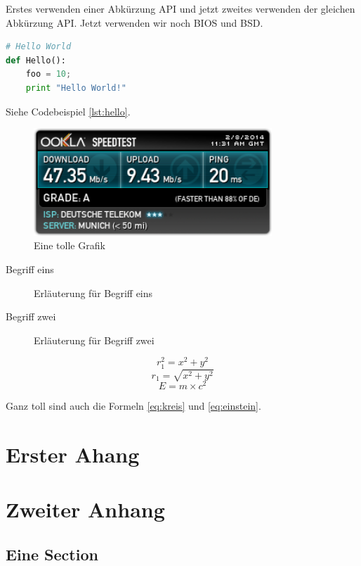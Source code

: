 \documentclass[
parskip=true,  %
fontsize=12pt, %
BCOR=12mm,     %
twoside=false,  %
numbers=noenddot %
]{scrreprt}
\begin{document}
\blindtext\blindtext

Erstes verwenden einer Abkürzung \ac{API} und jetzt zweites verwenden der
gleichen Abkürzung \ac{API}. Jetzt verwenden wir noch \ac{BIOS} und \ac{BSD}.

\blindtext

\minipage{\linewidth} %
\begin{lstlisting}[language=python,caption={Hello World},label=lst:hello]
# Hello World
def Hello():
    foo = 10;
    print "Hello World!"
\end{lstlisting}
\endminipage

Siehe Codebeispiel \ref{lst:hello}.

\blindtext

\begin{figure}[ht]
    \centering
    \includegraphics[width=0.8\textwidth]{img/bild.png}
    \caption{Eine tolle Grafik}
    \label{abb:tollegrafik}
\end{figure}

\blindtext

\begin{description}
\item[Begriff eins] Erläuterung für Begriff eins
\item[Begriff zwei] Erläuterung für Begriff zwei
\end{description}

\blindtext

\begin{equation}
    r_1^2 = x^2 + y^2
    \label{eq:kreis}
\end{equation}
\begin{equation}
    r_1 = \sqrt{x^2 + y^2}
    \label{eq:kreis2}
\end{equation}
\begin{equation}
    E = m \times c^2
    \label{eq:einstein}
\end{equation}

Ganz toll sind auch die Formeln \ref{eq:kreis} und \ref{eq:einstein}.

\blindtext

\appendix

\chapter{Erster Ahang}

\blindtext

\chapter{Zweiter Anhang}
\section{Eine Section}

\blindtext



\end{document}
